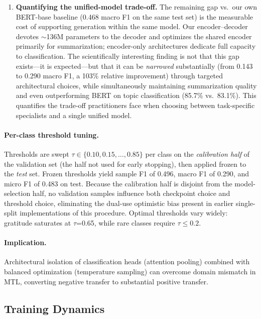 \documentclass[11pt]{article}
\begin{document}
\begin{enumerate}
    \item \textbf{Quantifying the unified-model trade-off.} The remaining gap vs.\ our own BERT-base baseline (0.468 macro F1 on the same test set) is the measurable cost of supporting generation within the same model. Our encoder--decoder devotes $\sim$136M parameters to the decoder and optimizes the shared encoder primarily for summarization; encoder-only architectures dedicate full capacity to classification. The scientifically interesting finding is not that this gap exists---it is expected---but that it can be \textit{narrowed} substantially (from 0.143 to 0.290 macro F1, a 103\% relative improvement) through targeted architectural choices, while simultaneously maintaining summarization quality and even outperforming BERT on topic classification (85.7\% vs.\ 83.1\%). This quantifies the trade-off practitioners face when choosing between task-specific specialists and a single unified model.
\end{enumerate}

\paragraph{Per-class threshold tuning.} Thresholds are swept $\tau \in \{0.10, 0.15, \ldots, 0.85\}$ per class on the \emph{calibration half} of the validation set (the half not used for early stopping), then applied frozen to the \textit{test} set. Frozen thresholds yield sample F1 of 0.496, macro F1 of 0.290, and micro F1 of 0.483 on test. Because the calibration half is disjoint from the model-selection half, no validation samples influence both checkpoint choice and threshold choice, eliminating the dual-use optimistic bias present in earlier single-split implementations of this procedure. Optimal thresholds vary widely: gratitude saturates at $\tau$=0.65, while rare classes require $\tau \leq 0.2$.

\paragraph{Implication.} Architectural isolation of classification heads (attention pooling) combined with balanced optimization (temperature sampling) can overcome domain mismatch in MTL, converting negative transfer to substantial positive transfer.

\subsection{Training Dynamics}
\end{document}
